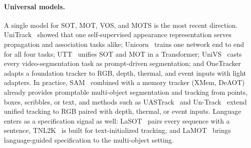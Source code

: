 \paragraph{Universal models.}
A single model for SOT, MOT, VOS, and MOTS is the most recent direction. UniTrack~\cite{wang2021different} showed that one self-supervised appearance representation serves propagation and association tasks alike; Unicorn~\cite{yan2022unicorn} trains one network end to end for all four tasks; UTT~\cite{MaSZ0XYY22} unifies SOT and MOT in a Transformer; UniVS~\cite{li2024univs} casts every video-segmentation task as prompt-driven segmentation; and OneTracker~\cite{HongYZLZGJCLCZ24} adapts a foundation tracker to RGB, depth, thermal, and event inputs with light adapters. In practice, SAM~\cite{kirillov2023sam} combined with a memory tracker (XMem, DeAOT) already provides promptable multi-object segmentation and tracking from points, boxes, scribbles, or text, and methods such as UASTrack~\cite{UASTrack} and Un-Track~\cite{WuZRV0PGT24UNTrack} extend unified tracking to RGB paired with depth, thermal, or event inputs. Language enters as a specification signal as well: LaSOT~\cite{fan2019lasot} pairs every sequence with a sentence, TNL2K~\cite{wang2021tnl2k} is built for text-initialized tracking, and LaMOT~\cite{li2025lamot} brings language-guided specification to the multi-object setting.

